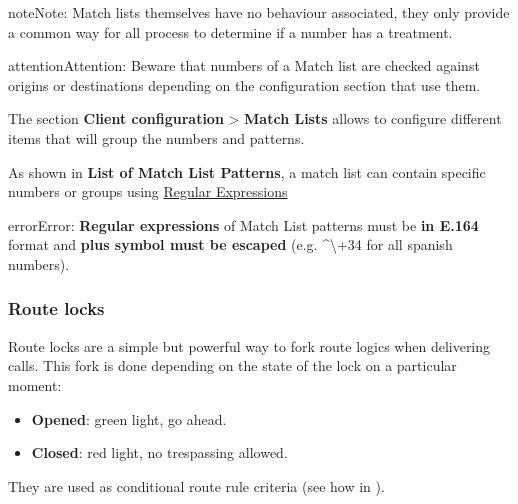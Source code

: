 \documentclass[letterpaper,10pt,english]{sphinxmanual}
\begin{document}
\begin{notice}{note}{Note:}
Match lists themselves have no behaviour associated, they only provide
a common way for all process to determine if a number has a treatment.
\end{notice}

\begin{notice}{attention}{Attention:}
Beware that numbers of a Match list are checked against origins
or destinations depending on the configuration section that use them.
\end{notice}

The section \textbf{Client configuration} \textgreater{} \textbf{Match Lists} allows to configure
different items that will group the numbers and patterns.

As shown in \textbf{List of Match List Patterns}, a match list can contain specific numbers or groups using
\href{http://php.net/manual/en/reference.pcre.pattern.syntax.php}{Regular Expressions}

\begin{notice}{error}{Error:}
\textbf{Regular expressions} of Match List patterns must be \textbf{in E.164} format and \textbf{plus symbol must be
escaped} (e.g. \textasciicircum{}\textbackslash{}+34 for all spanish numbers).
\end{notice}


\subsubsection{Route locks}
\label{administration_portal/client/vpbx/routing_tools/route_locks:id1}\label{administration_portal/client/vpbx/routing_tools/route_locks::doc}\label{administration_portal/client/vpbx/routing_tools/route_locks:route-locks}
Route locks are a simple but powerful way to fork route logics when delivering calls. This fork is done depending on the
state of the lock on a particular moment:
\begin{itemize}
\item {} 
\textbf{Opened}: green light, go ahead.

\item {} 
\textbf{Closed}: red light, no trespassing allowed.

\end{itemize}

They are used as conditional route rule criteria (see how in {\hyperref[administration_portal/client/vpbx/routing_endpoints/conditional_routes:conditional\string-routes]{}}).
\end{document}
